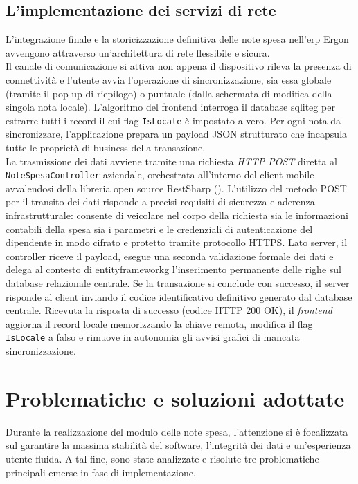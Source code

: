 \subsection*{L'implementazione dei servizi di rete}
\noindent L'integrazione finale e la storicizzazione definitiva delle note spesa nell'\gls{erp} Ergon avvengono attraverso un'architettura di rete flessibile e sicura. \\
Il canale di comunicazione si attiva non appena il dispositivo rileva la presenza di connettività e l'utente avvia l'operazione di sincronizzazione, sia essa globale (tramite il pop-up di riepilogo) o puntuale (dalla schermata di modifica della singola nota locale). L'algoritmo del frontend interroga il database \gls{sqliteg} per estrarre tutti i record il cui flag \texttt{IsLocale} è impostato a vero. Per ogni nota da sincronizzare, l'applicazione prepara un payload JSON strutturato che incapsula tutte le proprietà di business della transazione.\\
La trasmissione dei dati avviene tramite una richiesta \textit{HTTP POST} diretta al \texttt{NoteSpesaController} aziendale, orchestrata all'interno del client mobile avvalendosi della libreria open source RestSharp (\cite{site:restsharp}). L'utilizzo del metodo POST per il transito dei dati risponde a precisi requisiti di sicurezza e aderenza infrastrutturale: consente di veicolare nel corpo della richiesta sia le informazioni contabili della spesa sia i parametri e le credenziali di autenticazione del dipendente in modo cifrato e protetto tramite protocollo HTTPS. Lato server, il controller riceve il payload, esegue una seconda validazione formale dei dati e delega al contesto di \gls{entityframeworkg}  l'inserimento permanente delle righe sul database relazionale centrale. Se la transazione si conclude con successo, il server risponde al client inviando il codice identificativo definitivo generato dal database centrale. Ricevuta la risposta di successo (codice HTTP 200 OK), il \textit{frontend} aggiorna il record locale memorizzando la chiave remota, modifica il flag \texttt{IsLocale} a falso e rimuove in autonomia gli avvisi grafici di mancata sincronizzazione.



\section{Problematiche e soluzioni adottate}
\label{sec:problematiche-soluzioni}
\noindent Durante la realizzazione del modulo delle note spesa, l'attenzione si è focalizzata sul garantire la massima stabilità del software, l'integrità dei dati e un'esperienza utente fluida. A tal fine, sono state analizzate e risolute tre problematiche principali emerse in fase di implementazione.

